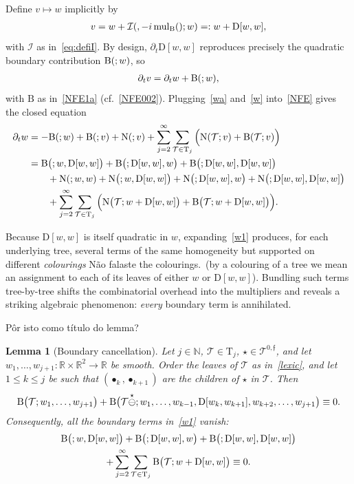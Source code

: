 \documentclass[a4paper,
11pt,  reqno]{amsart}
\makeatletter
\newcommand{\blue}{\color{blue}}
\newcommand{\orange}{\color{orange}}
\newcommand{\5}{\textup{V}}
\newcommand{\dt}{\partial_t}
\newtheorem{lemma}[theorem]{Lemma}
\theoremstyle{remark}
\newcommand{\R}{\mathbb{R}}
\newcommand{\bul}{\bullet}
\newcommand{\TT}{\mathcal{T}}
\newcommand{\Tr}{\mathrm{T}}
\newcommand{\ff}{\mathfrak{f}}
\newcommand{\N}{\mathbb{N}}
\DeclareMathOperator{\mulB}{mul_{\BB}}
\def\<#1>{\csname MH@symb@#1\endcsname}
\newcommand{\Ical}{\mathcal{I}}
\numberwithin{equation}{section}
\numberwithin{theorem}{section}
\newcommand{\NN}{\mathrm{N}}
\newcommand{\BB}{\mathrm{B}}
\newcommand{\D}{\mathrm{D}}
\makeatother
\begin{document}
Define $v\mapsto w$ implicitly by
\begin{align}
\label{w}
v = w + \Ical(\<1>, - i \mulB(\<1>); w) =: w + \D[w, w],
\end{align}
with $\Ical$ as in~\eqref{eq:defiI}. By design, $\partial_t\D[w,w]$ reproduces precisely the quadratic boundary contribution $\BB(\<1>;w)$, so
\begin{align}
\label{wa}
\dt v = \dt w + \BB(\<1>; w),
\end{align}
with $\BB$ as in~\eqref{NFE1a} (cf.~\eqref{NFE002}). Plugging~\eqref{wa} and~\eqref{w} into~\eqref{NFE} gives the closed equation
\begin{align}
\dt w
& = -\BB(\<1>;w) + \BB(\<1>;v) + \NN(\<1>;v) + \sum_{j=2}^\infty \sum_{\TT\in\Tr_j} \Big( \NN(\TT; v)  + \BB(\TT; v) \Big) \nonumber \\
& =  \BB\big(\<1>; w, \D[w, w] \big) + \BB \big(\<1>; \D[w, w],w\big) + \BB\big(\<1>; \D[w,w], \D[w, w]\big) \nonumber\\
& \qquad + \NN(\<1>; w ,w )  + \NN\big(\<1>; w, \D[w, w]\big) + \NN\big(\<1>; \D[w, w], w\big) + \NN\big(\<1>; \D[w, w],\D[w, w]\big) \nonumber\\
& \qquad + \sum_{j=2}^\infty \sum_{\TT\in \Tr_j} \Big( \NN\big(\TT; w+ \D[w, w] \big) +  \BB\big(\TT; w + \D[w, w]\big) \Big).
\label{w1}
\end{align}

Because $\D[w,w]$ is itself quadratic in $w$, expanding~\eqref{w1} produces, for each underlying tree, several terms of the same homogeneity but supported on different {\orange \emph{colourings}} {\blue Não falaste the colourings.}{\orange\ (by a colouring of a tree we mean an assignment to each of its leaves of either $w$ or $\D[w,w]$)}. Bundling such terms tree-by-tree shifts the combinatorial overhead into the multipliers and reveals a striking algebraic phenomenon: \emph{every} boundary term is annihilated.

{\blue Pôr isto como título do lemma?}

\begin{lemma}[{\orange Boundary cancellation}]
\label{LEM:wbd}
Let $j\in\N$, $\TT\in \Tr_j$, $\star \in \TT^{0,\ff}$, and let $w_1, \ldots, w_{j+1}: \R\times \R^2 \to \R$ be smooth. Order the leaves of $\TT$ as in~\eqref{lexic}, and let $1 \le k \le j$ be such that $(\bul_k, \bul_{k+1})$ are the children of $\star$ in $\TT$. Then
\begin{align}
\label{wbd0}
\BB\big(\TT ; w_1, \ldots, w_{j+1} \big)
+ \BB\big(\TT\overset{\star}{\ominus} \<1>; w_1,  \ldots, w_{k-1} , \D[w_k,w_{k+1}] , w_{k+2}, \ldots,  w_{j+1} \big) \equiv 0.
\end{align}
Consequently, all the boundary terms in~\eqref{w1} vanish:
\begin{multline}
\label{wbd1}
  \BB \big(\<1>; w, \D[w, w] \big)
+ \BB\big(\<1>; \D[w, w],w\big)
+ \BB\big(\<1>;\D[w, w], \D[w, w]\big)
\\
+ \sum_{j=2}^\infty \sum_{\TT\in \Tr_j}  \BB\big(\TT; w + \D[w, w]\big)  \equiv 0  .
\end{multline}
\end{lemma}
\end{document}
